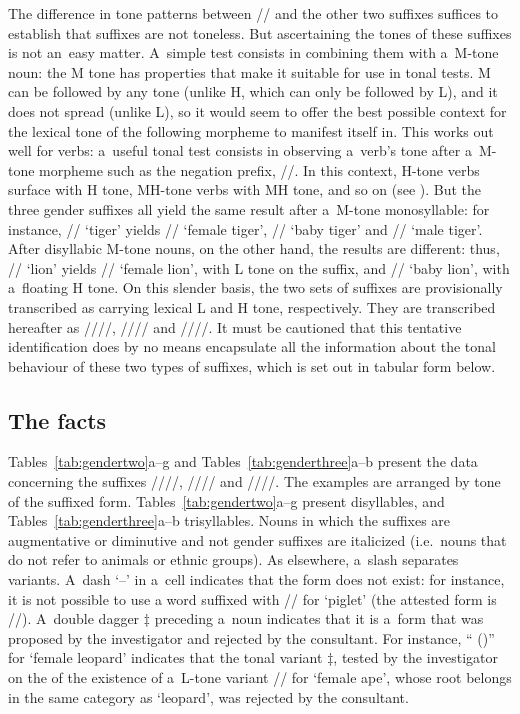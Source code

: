 The difference in tone patterns between // and the other two suffixes suffices to establish that suffixes are not toneless. But ascertaining the tones of these suffixes is not an~easy matter. A~simple test consists in combining them with a~M-tone noun: the M tone has properties that make it suitable for use in tonal tests. M can be followed by any tone (unlike H, which can only be followed by L), and it does not spread (unlike L), so it would seem to offer the best possible context for the lexical tone of the following morpheme to manifest itself in. This works out well for verbs: a~useful tonal test consists in observing a~verb's tone after a~M-tone morpheme such as the {negation} prefix, //. In this context, H-tone verbs surface with H tone, MH-tone verbs with MH tone, and so on (see ). But the three gender suffixes all yield the same result after a~M-tone {monosyllable}: for instance, // ‘tiger’ yields // ‘female tiger’, // ‘baby tiger’ and // ‘male tiger’. After disyllabic M-tone nouns, on the other hand, the results are different: thus, // ‘lion’ yields // ‘female lion’, with L tone on the suffix, and // ‘baby lion’, with a~floating H tone. On this slender basis, the two sets of suffixes are provisionally transcribed as carrying lexical L and H tone, respectively. They are transcribed hereafter as ////, //// and ////. It must be cautioned that this tentative identification does by no means encapsulate all the information about the tonal behaviour of these two types of suffixes, which is set out in tabular form below.


\subsection{The facts}
\label{sec:thegendersuffixesfacts}

Tables~\ref{tab:gendertwo}a--g and Tables~\ref{tab:genderthree}a--b
present the data concerning the suffixes ////, //// and ////. The examples are arranged by tone of the suffixed form. Tables~\ref{tab:gendertwo}a--g
present disyllables, and Tables~\ref{tab:genderthree}a--b
trisyllables. Nouns in which the suffixes are augmentative or diminutive
and not gender suffixes are italicized (i.e.\ nouns that do not refer
to animals or ethnic groups). As elsewhere, a~slash separates
variants. A~dash ‘--’ in a~cell indicates that the
form does not exist: for instance, it is not possible to use a word suffixed with // for ‘piglet’ (the attested form is
//). A~double dagger $\ddagger$ preceding a~noun indicates that it is
a~form that was proposed by the investigator and rejected by the
consultant. For instance, “ ()” for ‘female
leopard’ indicates that the tonal {variant} $\ddagger${\kern2pt}, tested by
the investigator on the  of the existence of a~L-tone {variant}
// for ‘female ape’, whose root belongs in the same
category as ‘leopard’, was rejected by the consultant.

